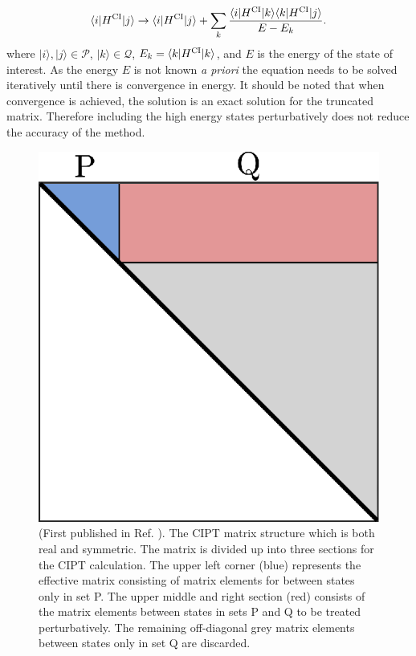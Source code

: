 \documentclass[10pt,a4paper, twoside, openright]{report}
\begin{document}
\begin{equation}
\langle i|H^{\rm CI}|j\rangle \rightarrow \langle i|H^{\rm CI}|j\rangle + 
\sum_k \frac{\langle i|H^{\rm CI}|k\rangle\langle k|H^{\rm
    CI}|j\rangle}{E - E_k}. 
    \label{eq:HCI}
\end{equation}
where $|i\rangle, |j\rangle \in \mathcal{P}$, $|k\rangle \in \mathcal{Q}$,  $E_k = \langle k|H^{\rm CI}|k\rangle$, and $E$ is the energy of the state of interest.  As the energy $E$ is not known \textit{a priori} the equation needs to be solved iteratively until there is convergence in energy. It should be noted that when convergence is achieved, the solution is an exact solution for the truncated matrix. Therefore including the high energy states perturbatively does not reduce the accuracy of the method.
\begin{figure}
\centering
\includegraphics[scale=1]{./figures/CIPT_matrix.eps}
\caption[CIPT matrix structure.]{(First published in Ref. \cite{DBHF2017}). The CIPT matrix structure which is both real and symmetric. The matrix is divided up into three sections for the CIPT calculation. The upper left corner (blue) represents the effective matrix consisting of matrix elements for between states only in set P. The upper middle and right section (red) consists of the matrix elements between states in sets P and Q to be treated perturbatively. The remaining off-diagonal grey matrix elements between states only in set Q are discarded. \label{fig:CIPT_matrix}}
\end{figure}
\iffalse
\end{document}
